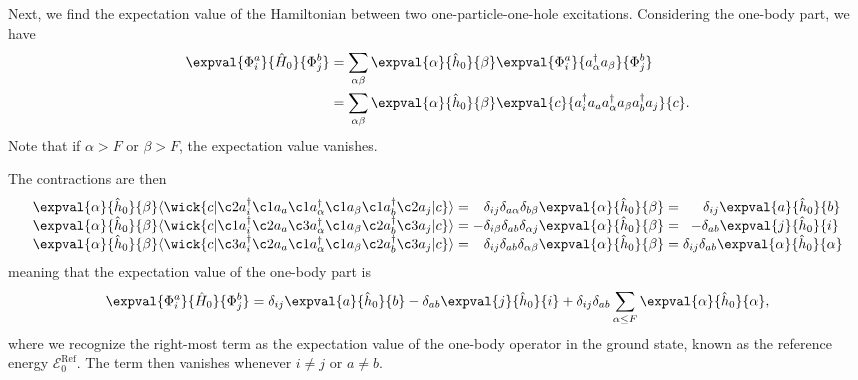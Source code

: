 Next, we find the expectation value of the Hamiltonian between two one-particle-one-hole excitations.
Considering the one-body part, we have
\begin{align*}
    \expval{\Phi_i^a}{\hat{H}_0}{\Phi_j^b} &= \sum_{\alpha\beta} \expval{\alpha}{\hat{h}_0}{\beta} \expval{\Phi_i^a}{a_\alpha^\dagger a_\beta}{\Phi_j^b} \\
    &= \sum_{\alpha\beta} \expval{\alpha}{\hat{h}_0}{\beta} \expval{c}{a_i^\dagger a_a  a_\alpha^\dagger a_\beta a_b^\dagger a_j}{c}.
\end{align*}
Note that if $\alpha > F$ or $\beta > F$, the expectation value vanishes.

The contractions are then
\begin{equation*}
    \arraycolsep=1.4pt
    \begin{array}{rlrcr}
        \expval{\alpha}{\hat{h}_0}{\beta}
        \langle
        \wick{
            c
            \vert
            \c2 a_i^\dagger \c1 a_a \c1 a_\alpha^\dagger \c1 a_\beta \c1 a_b^\dagger \c2 a_j
            \vert
            c
        }
        \rangle
        &=& \delta_{ij} \delta_{a \alpha} \delta_{b \beta} \expval{\alpha}{\hat{h}_0}{\beta}
        &=& \delta_{ij} \expval{a}{\hat{h}_0}{b} \,
        \\
        \expval{\alpha}{\hat{h}_0}{\beta}
        \langle
        \wick{
            c
            \vert
            \c1 a_i^\dagger \c2 a_a \c3 a_\alpha^\dagger \c1 a_\beta \c2 a_b^\dagger \c3 a_j
            \vert
            c
        }
        \rangle
        &= &- \delta_{i \beta} \delta_{a b} \delta_{\alpha j} \expval{\alpha}{\hat{h}_0}{\beta}
        &=& -\delta_{ab} \expval{j}{\hat{h}_0}{i} \;  \\
        \expval{\alpha}{\hat{h}_0}{\beta}
        \langle
        \wick{
            c
            \vert
            \c3 a_i^\dagger \c2 a_a \c1 a_\alpha^\dagger \c1 a_\beta \c2 a_b^\dagger \c3 a_j
            \vert
            c
        }
        \rangle
        &=& \delta_{i j} \delta_{a b} \delta_{\alpha \beta} \expval{\alpha}{\hat{h}_0}{\beta}
        &=& \delta_{i j} \delta_{a b} \expval{\alpha}{\hat{h}_0}{\alpha} \\
    \end{array}
\end{equation*}
meaning that the expectation value of the one-body part is
\begin{equation*}
    \expval{\Phi_i^a}{\hat{H}_0}{\Phi_j^b} = \delta_{ij} \expval{a}{\hat{h}_0}{b} - \delta_{ab} \expval{j}{\hat{h}_0}{i} + \delta_{ij} \delta_{ab} \sum_{\alpha \leq F} \expval{\alpha}{\hat{h}_0}{\alpha},
\end{equation*}
where we recognize the right-most term as the expectation value of the one-body operator in the ground state, known as the reference energy $\mathcal{E}_0^{\text{Ref}}$.
The term then vanishes whenever $i \neq j$ or $a \neq b$.

